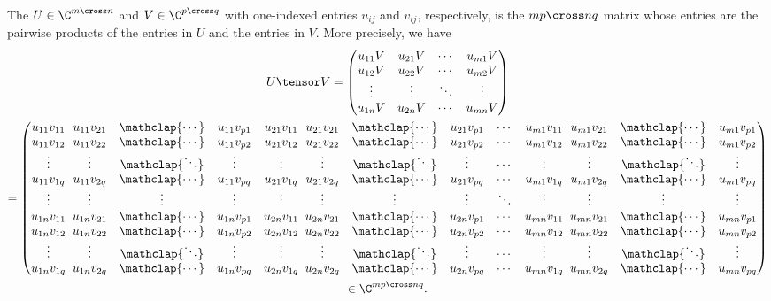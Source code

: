 \begin{definition}[Tensor product]
  \def\icdots{\mathclap{\cdots}}
  \def\iddots{\mathclap{\ddots}}
  The  $U \in \C^{m \cross n}$ and $V \in \C^{p
  \cross q}$ with one-indexed\footnotemark{} entries $u_{ij}$ and $v_{ij}$,
  respectively, is the $mp \cross nq$ matrix whose entries are the pairwise
  products of the entries in $U$ and the entries in $V$.  More precisely, we
  have \begin{gather*}
    U \tensor V =
    \begin{pmatrix}
      u_{11}V & u_{21}V & \cdots & u_{m1}V \\
      u_{12}V & u_{22}V & \cdots & u_{m2}V \\
      \vdots & \vdots & \ddots & \vdots \\
      u_{1n}V & u_{2n}V & \cdots & u_{mn}V
    \end{pmatrix} \\ =
    \left(\begin{array}{@{}*{2}{c@{\;\;}ccc}cc@{\;\;}ccc@{}}
      u_{11}v_{11} & u_{11}v_{21} & \icdots & u_{11}v_{p1} &
      u_{21}v_{11} & u_{21}v_{21} & \icdots & u_{21}v_{p1} &
      \cdots &
      u_{m1}v_{11} & u_{m1}v_{21} & \icdots & u_{m1}v_{p1}
      \\
      u_{11}v_{12} & u_{11}v_{22} & \icdots & u_{11}v_{p2} &
      u_{21}v_{12} & u_{21}v_{22} & \icdots & u_{21}v_{p2} &
      \cdots &
      u_{m1}v_{12} & u_{m1}v_{22} & \icdots & u_{m1}v_{p2}
      \\
      \vdots & \vdots & \iddots & \vdots &
      \vdots & \vdots & \iddots & \vdots &
      \cdots &
      \vdots & \vdots & \iddots & \vdots
      \\
      u_{11}v_{1q} & u_{11}v_{2q} & \icdots & u_{11}v_{pq} &
      u_{21}v_{1q} & u_{21}v_{2q} & \icdots & u_{21}v_{pq} &
      \cdots &
      u_{m1}v_{1q} & u_{m1}v_{2q} & \icdots & u_{m1}v_{pq}
      \\
      \vdots & \vdots & \vdots & \vdots &
      \vdots & \vdots & \vdots & \vdots &
      \ddots &
      \vdots & \vdots & \vdots & \vdots
      \\
      u_{1n}v_{11} & u_{1n}v_{21} & \icdots & u_{1n}v_{p1} &
      u_{2n}v_{11} & u_{2n}v_{21} & \icdots & u_{2n}v_{p1} &
      \cdots &
      u_{mn}v_{11} & u_{mn}v_{21} & \icdots & u_{mn}v_{p1}
      \\
      u_{1n}v_{12} & u_{1n}v_{22} & \icdots & u_{1n}v_{p2} &
      u_{2n}v_{12} & u_{2n}v_{22} & \icdots & u_{2n}v_{p2} &
      \cdots &
      u_{mn}v_{12} & u_{mn}v_{22} & \icdots & u_{mn}v_{p2}
      \\
      \vdots & \vdots & \iddots & \vdots &
      \vdots & \vdots & \iddots & \vdots &
      \cdots &
      \vdots & \vdots & \iddots & \vdots
      \\
      u_{1n}v_{1q} & u_{1n}v_{2q} & \icdots & u_{1n}v_{pq} &
      u_{2n}v_{1q} & u_{2n}v_{2q} & \icdots & u_{2n}v_{pq} &
      \cdots &
      u_{mn}v_{1q} & u_{mn}v_{2q} & \icdots & u_{mn}v_{pq}
    \end{array}\right) \\ \in \C^{mp \cross nq}.
  \end{gather*}


\end{definition}
